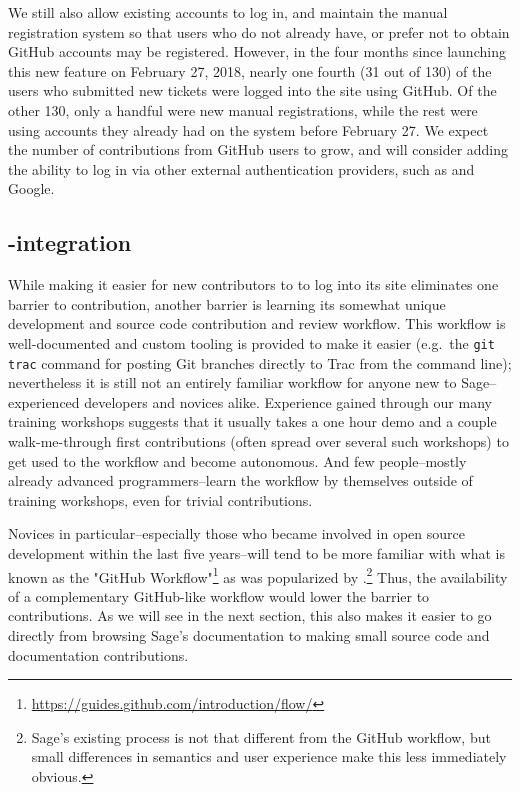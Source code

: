 We still also allow existing accounts to log in, and maintain the manual
registration system so that users who do not already have, or prefer not to
obtain GitHub accounts may be registered.  However, in the four months since
launching this new feature on February 27, 2018, nearly one fourth (31 out of
130) of the users who submitted new tickets were logged into the site using
GitHub.  Of the other 130, only a handful were new manual registrations, while
the rest were using accounts they already had on the system before February 27.
We expect the number of contributions from GitHub users to grow, and will
consider adding the ability to log in via other external authentication
providers, such as \GitLab and Google.


\hypertarget{gitlab-trac-integration}{%
\subsection{\GitLab-\Trac integration}\label{gitlab-trac-integration}}

While making it easier for new contributors to \Sage to log into its \Trac site
eliminates one barrier to contribution, another barrier is learning its
somewhat unique development and source code contribution and review workflow.
This workflow is well-documented and custom tooling is provided to make it
easier (e.g.~the {\tt git trac} command for posting Git branches directly to
Trac from the command line); nevertheless it is still not an entirely familiar
workflow for anyone new to Sage--experienced developers and novices alike.
%
Experience gained through our many training workshops suggests that it usually
takes a one hour demo and a couple walk-me-through first contributions (often
spread over several such workshops) to get used to the workflow and become
autonomous. And few people--mostly already advanced programmers--learn the
workflow by themselves outside of training workshops, even for trivial
contributions.

Novices in particular--especially those who became involved in open source
development within the last five years--will tend to be more familiar with what
is known as the "GitHub
Workflow"\footnote{\url{https://guides.github.com/introduction/flow/}} as was
popularized by \GitHub.\footnote{Sage's existing process is not that different
from the GitHub workflow, but small differences in semantics and user
experience make this less immediately obvious.} Thus, the availability of a
complementary GitHub-like workflow would lower the barrier to contributions.
As we will see in the next section, this also makes it easier to go directly
from browsing Sage's documentation to making small source code and
documentation contributions.

